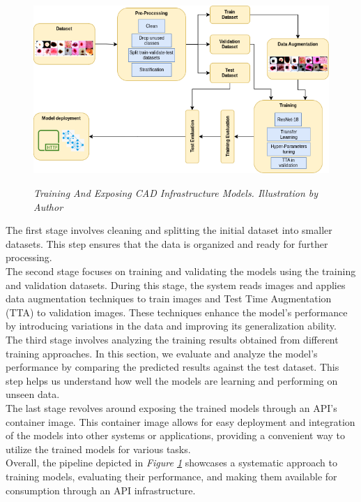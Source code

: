 \begin{figure}[H]
  \centering
  \includegraphics[width=\textwidth]{imatges/methodological_contribution/Pipeline.drawio.png}
  \caption[Training And Exposing CAD Infrastructure Models]{\textit{Training And Exposing CAD Infrastructure Models. Illustration by Author}}
  {\label{fig:cad-infrastructure-training-system}}
\end{figure}

The first stage involves cleaning and splitting the initial dataset into
smaller datasets. This step ensures that the data is organized and ready for
further processing. \\

The second stage focuses on training and validating the models using the
training and validation datasets. During this stage, the system reads images
and applies data augmentation techniques to train images and Test Time
Augmentation (TTA) to validation images. These techniques enhance the model's
performance by introducing variations in the data and improving its
generalization ability. \\

The third stage involves analyzing the training results obtained from different
training approaches. In this section, we evaluate and analyze the model's
performance by comparing the predicted results against the test dataset. This
step helps us understand how well the models are learning and performing on
unseen data. \\

The last stage revolves around exposing the trained models through an API's
container image. This container image allows for easy deployment and
integration of the models into other systems or applications, providing a
convenient way to utilize the trained models for various tasks. \\

Overall, the pipeline depicted in \textit{Figure
\ref{fig:cad-infrastructure-training-system}} showcases a systematic approach
to training models, evaluating their performance, and making them available for
consumption through an API infrastructure.
